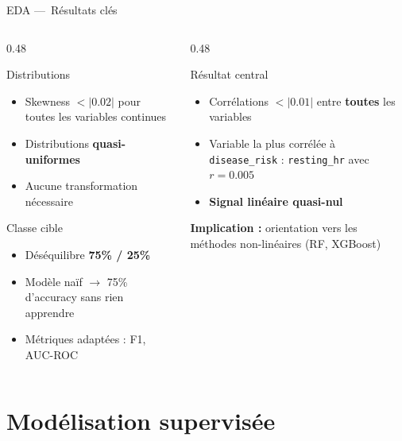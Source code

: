 \documentclass[12pt]{beamer}
\begin{document}
\begin{frame}{EDA ---~Résultats clés}

\begin{columns}[T]
\begin{column}{0.48\textwidth}
\begin{block}{Distributions}
\begin{itemize}
  \item Skewness $< |0.02|$ pour toutes les variables continues
  \item Distributions \textbf{quasi-uniformes}
  \item Aucune transformation nécessaire
\end{itemize}
\end{block}

\medskip

\begin{block}{Classe cible}
\begin{itemize}
  \item Déséquilibre \textbf{75\% / 25\%}
  \item Modèle naïf $\rightarrow$ 75\% d'accuracy sans rien apprendre
  \item Métriques adaptées : F1, AUC-ROC
\end{itemize}
\end{block}
\end{column}

\begin{column}{0.48\textwidth}
\begin{block}{\alert{Résultat central}}
\begin{itemize}
  \item Corrélations $< |0.01|$ entre \textbf{toutes} les variables
  \item Variable la plus corrélée à \texttt{disease\_risk} : \texttt{resting\_hr} avec $r = 0.005$
  \item \textbf{Signal linéaire quasi-nul}
\end{itemize}
\end{block}

\medskip

\textbf{Implication :} orientation vers les méthodes non-linéaires (RF, XGBoost)
\end{column}
\end{columns}

\end{frame}

\section{Modélisation supervisée}
\end{document}

